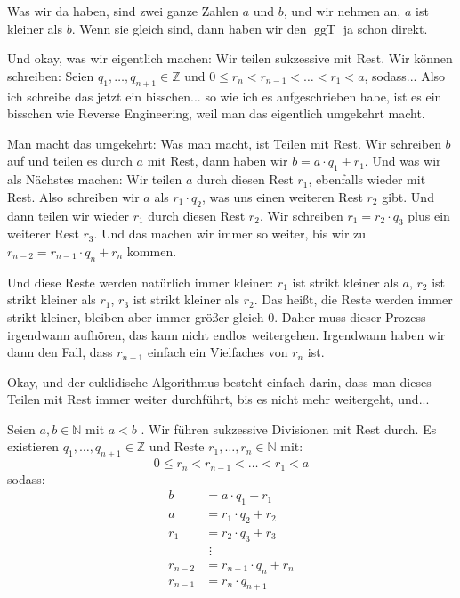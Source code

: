 \begin{spoken-clean}[00:30:44 - 00:33:37]
Was wir da haben, sind zwei ganze Zahlen $a$ und $b$, und wir nehmen an, $a$ ist kleiner als $b$. Wenn sie gleich sind, dann haben wir den $\operatorname{ggT}$ ja schon direkt.

Und okay, was wir eigentlich machen: Wir teilen sukzessive mit Rest. Wir können schreiben: Seien $q_1, \dots, q_{n+1} \in \mathbb{Z}$ und $0 \le r_n < r_{n-1} < \dots < r_1 < a$, sodass... Also ich schreibe das jetzt ein bisschen... so wie ich es aufgeschrieben habe, ist es ein bisschen wie Reverse Engineering, weil man das eigentlich umgekehrt macht.

Man macht das umgekehrt: Was man macht, ist Teilen mit Rest. Wir schreiben $b$ auf und teilen es durch $a$ mit Rest, dann haben wir $b = a \cdot q_1 + r_1$. Und was wir als Nächstes machen: Wir teilen $a$ durch diesen Rest $r_1$, ebenfalls wieder mit Rest. Also schreiben wir $a$ als $r_1 \cdot q_2$, was uns einen weiteren Rest $r_2$ gibt. Und dann teilen wir wieder $r_1$ durch diesen Rest $r_2$. Wir schreiben $r_1 = r_2 \cdot q_3$ plus ein weiterer Rest $r_3$. Und das machen wir immer so weiter, bis wir zu $r_{n-2} = r_{n-1} \cdot q_n + r_n$ kommen.

Und diese Reste werden natürlich immer kleiner: $r_1$ ist strikt kleiner als $a$, $r_2$ ist strikt kleiner als $r_1$, $r_3$ ist strikt kleiner als $r_2$. Das heißt, die Reste werden immer strikt kleiner, bleiben aber immer größer gleich $0$. Daher muss dieser Prozess irgendwann aufhören, das kann nicht endlos weitergehen. Irgendwann haben wir dann den Fall, dass $r_{n-1}$ einfach ein Vielfaches von $r_n$ ist.

Okay, und der euklidische Algorithmus besteht einfach darin, dass man dieses Teilen mit Rest immer weiter durchführt, bis es nicht mehr weitergeht, und...
\end{spoken-clean}

\begin{math-stroke}
Seien $a, b \in \mathbb{N}$ mit $a < b$ \inlinemetanote{[Anmerkung: Hier muss $a > 0$ vorausgesetzt werden, da sonst der erste Divisionsschritt $b = a \cdot q_1 + r_1$ nicht durchführbar ist (Division durch Null)]}. Wir führen sukzessive Divisionen mit Rest durch. Es existieren $q_1, \dots, q_{n+1} \in \mathbb{Z}$ und Reste $r_1, \dots, r_n \in \mathbb{N}$ mit:
\[ 0 \le r_n < r_{n-1} < \dots < r_1 < a \]
sodass:
\begin{align}
b &= a \cdot q_1 + r_1 \label{eq:euclid-step1} \\
a &= r_1 \cdot q_2 + r_2 \label{eq:euclid-step2} \\
r_1 &= r_2 \cdot q_3 + r_3 \label{eq:euclid-step3} \\
&\,\,\vdots \nonumber \\
r_{n-2} &= r_{n-1} \cdot q_n + r_n \label{eq:euclid-step-n-1} \\
r_{n-1} &= r_n \cdot q_{n+1} \label{eq:euclid-step-n}
\end{align}
\end{math-stroke}

